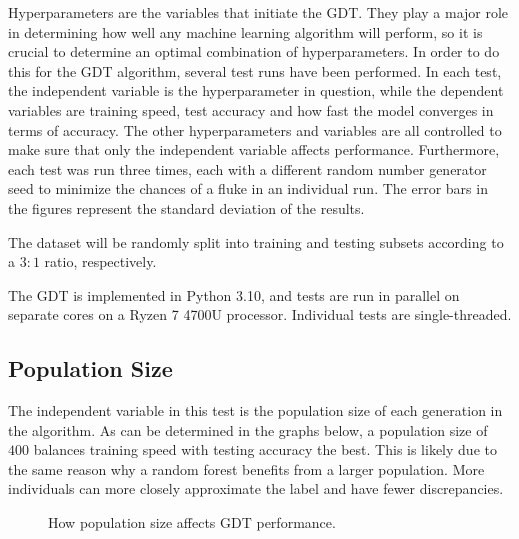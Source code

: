 \documentclass[12pt]{article}
\begin{document}
Hyperparameters are the variables that initiate the GDT. They play a major role in determining how well any machine learning algorithm will perform, so it is crucial to determine an optimal combination of hyperparameters. In order to do this for the GDT algorithm, several test runs have been performed. In each test, the independent variable is the hyperparameter in question, while the dependent variables are training speed, test accuracy and how fast the model converges in terms of accuracy. The other hyperparameters and variables are all controlled to make sure that only the independent variable affects performance. Furthermore, each test was run three times, each with a different random number generator seed to minimize the chances of a fluke in an individual run. The error bars in the figures represent the standard deviation of the results.

The dataset will be randomly split into training and testing subsets according to a $3:1$ ratio, respectively.

The GDT is implemented in Python 3.10, and tests are run in parallel on separate cores on a Ryzen 7 4700U processor. Individual tests are single-threaded.

\subsection{Population Size}

The independent variable in this test is the population size of each generation in the algorithm. As can be determined in the graphs below, a population size of $400$ balances training speed with testing accuracy the best. This is likely due to the same reason why a random forest benefits from a larger population. More individuals can more closely approximate the label and have fewer discrepancies.

\begin{figure}[H]
    \centering
    \caption{How population size affects GDT performance.}
\end{figure}
\end{document}
